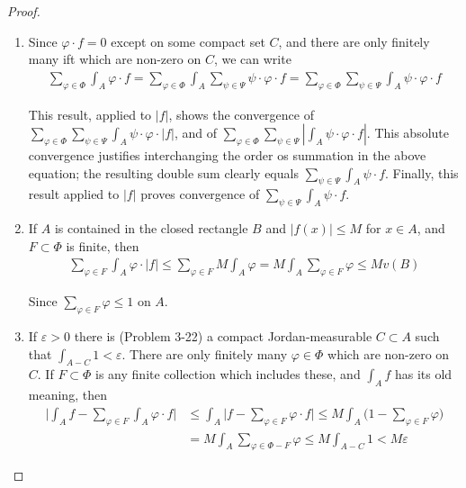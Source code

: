 \begin{proof}
    \begin{enumerate}[label=\upshape{(\arabic*)}]
        \item Since $\varphi\cdot f = 0$ except on some compact set $C$, and there
            are only finitely many ift which are non-zero on $C$, we can write
            \begin{align*}
                \sum_{\varphi\in\Phi}\int_A\varphi\cdot f=\sum_{\varphi\in\Phi}\int_A\sum_{\psi\in\Psi}\psi\cdot\varphi\cdot f=\sum_{\varphi\in\Phi}\sum_{\psi\in\Psi}\int_A\psi\cdot\varphi\cdot f
            \end{align*}

            This result, applied to $|f|$, shows the convergence of\\
            $\sum_{\varphi\in\Phi}^{}{\sum_{\psi\in\Psi}^{}{\int_A \psi\cdot \varphi\cdot |f|}}$, and of $\sum_{\varphi\in\Phi}^{}
            {\sum_{\psi\in\Psi}^{}{|\int_A \psi\cdot\varphi\cdot f|}}$. This absolute convergence justifies interchanging
            the order os summation in the above equation; the resulting double sum clearly equals $\sum_{\psi\in\Psi}^{
            }{\int_A \psi\cdot f}$. Finally, this result applied to $|f|$ proves convergence of 
            $\sum_{\psi\in\Psi}^{}{\int_A \psi\cdot f}$.
        \item If $A$ is contained in the closed rectangle $B$ and $|f(x)| \le M$
            for $x\in A$, and $F\subset \Phi$ is finite, then
            \begin{align*}
                \sum_{\varphi\in F}\int_{A}\varphi\cdot|f|\leq\sum_{\varphi\in F}M\int_{A}\varphi=M\int_{A}\sum_{\varphi\in F}\varphi\leq Mv(B)
            \end{align*}

            Since $\sum_{\varphi\in F}^{}{\varphi} \le 1$ on $A$.
        \item If $\varepsilon > 0$ there is (Problem 3-22) a compact Jordan-measurable 
            $C \subset A$ such that $\int_{A-C} 1<\varepsilon$. There are only
            finitely many $\varphi\in\Phi$ which are non-zero on $C$. If $F \subset \Phi$
            is any finite collection which includes these, and $\int_A f$ has its old meaning, 
            then 
            \begin{align*}
                \biggl|\int_A f - \sum_{\varphi\in F}^{}{\int_A \varphi\cdot f}\biggr|
                & \le \int_A \biggl|f-\sum_{\varphi\in F}^{}{\varphi\cdot f}\biggr| 
                  \le M \int_A \biggl(1-\sum_{\varphi\in F}^{}{\varphi}\biggr) \\
                & = M \int_A \sum_{\varphi\in \Phi - F}^{}{\varphi}
                  \le M \int_{A-C} 1
                  < M\varepsilon
            \end{align*}
    \end{enumerate}
\end{proof}


